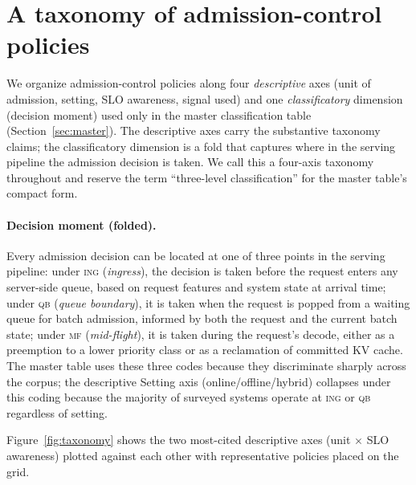 \documentclass[11pt,letterpaper]{article}
\theoremstyle{definition}
\begin{document}
\section{A taxonomy of admission-control policies}
\label{sec:taxonomy}

We organize admission-control policies along four \emph{descriptive}
axes (unit of admission, setting, SLO awareness, signal used) and one
\emph{classificatory} dimension (decision moment) used only in the
master classification table (Section~\ref{sec:master}). The
descriptive axes carry the substantive taxonomy claims; the
classificatory dimension is a fold that captures where in the
serving pipeline the admission decision is taken. We call this a
four-axis taxonomy throughout and reserve the term ``three-level
classification'' for the master table's compact form.

\paragraph{Decision moment (folded).} Every admission decision can
be located at one of three points in the serving pipeline:
under \textsc{ing} (\emph{ingress}), the decision is taken before the
request enters any server-side queue, based on request features and
system state at arrival time; under \textsc{qb} (\emph{queue
boundary}), it is taken when the request is popped from a waiting
queue for batch admission, informed by both the request and the
current batch state; under \textsc{mf} (\emph{mid-flight}), it is
taken during the request's decode, either as a preemption to a
lower priority class or as a reclamation of committed KV cache. The
master table uses these three codes because they discriminate
sharply across the corpus; the descriptive Setting axis
(online/offline/hybrid) collapses under this coding because the
majority of surveyed systems operate at \textsc{ing} or \textsc{qb}
regardless of setting.

Figure~\ref{fig:taxonomy} shows the two most-cited descriptive axes
(unit $\times$ SLO awareness) plotted against each other with
representative policies placed on the grid.
\end{document}
